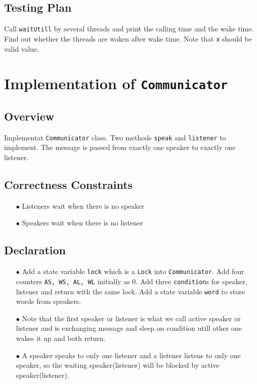 \documentclass{article}
\begin{document}
 \subsection{Testing Plan}
 Call \texttt{waitUtill} by several threads and print the calling time and the wake time. Find out whether the threads are waken after wake time. 
 Note that \texttt{x} should be valid value.
\section{Implementation of \texttt{Communicator}}
\subsection{Overview}
Implementat \texttt{Communicator} class. Two methods \texttt{speak} and \texttt{listener} to implement. The message is passed from exactly one 
speaker to exactly one listener.
\subsection{Correctness Constraints}
\begin{enumerate}
	\item[$\bullet$] Listeners wait when there is no speaker
	\item[$\bullet$] Speakers wait when there is no listener
\end{enumerate}
\subsection{Declaration}
\begin{enumerate}
	\item[$\bullet$] Add a state variable \texttt{lock} which is a \texttt{Lock} into \texttt{Communicator}. 
		Add four counters \texttt{AS, WS, AL, WL} initially as 0. Add three \texttt{condition}s for speaker, listener and return with the same lock.
		Add a state variable \texttt{word} to store words from speakers.
	\item[$\bullet$] Note that the first speaker or listener is what we call active speaker
		or listener and is exchanging message and sleep on condition utill other one wakes it up and both return.
	\item[$\bullet$] A speaker speaks to only one listener and a listener listens to only one speaker, so the waiting speaker(listener) will be 
		blocked by active speaker(listener).
\end{enumerate}
\end{document}
